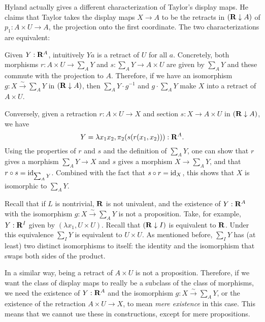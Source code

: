 \begin{remark}
  Hyland actually gives a different characterization of Taylor's display maps. He claims that Taylor takes the display maps $ X \to A $ to be the retracts in $ (\mathbf{R} \downarrow A) $ of $ p_1: A \times U \to A $,
  the projection onto the first coordinate. The two characterizations are equivalent:

  Given $ Y: \mathbf{R}^A $, intuitively $ Y a $ is a retract of $ U $ for all $ a $. Concretely, both morphisms $ r : A \times U \to \sum_A Y $ and $ s : \sum_A Y \to A \times U $ are given by $ \sum_A Y $ and these commute with the projection to $ A $. Therefore, if we have an isomorphism $ g: X \xrightarrow{\sim} \sum_A Y $ in $ (\mathbf{R} \downarrow A) $, then $ \sum_A Y \cdot g^{-1} $ and $ g \cdot \sum_A Y $ make $ X $ into a retract of $ A \times U $.

  Conversely, given a retraction $ r : A \times U \to X $ and section $ s : X \to A \times U $ in $ (\mathbf{R} \downarrow A) $, we have
  \[ Y = \lambda x_1 x_2, \pi_2 (s (r (x_1, x_2))) : \mathbf{R}^A. \]
  Using the properties of $ r $ and $ s $ and the definition of $ \sum_A Y $, one can show that $ r $ gives a morphism $ \sum_A Y \to X $ and $ s $ gives a morphism $ X \to \sum_A Y $, and that $ r \circ s = \text{id}_{\sum_A Y} $. Combined with the fact that $ s \circ r = \text{id}_{X} $, this shows that $ X $ is isomorphic to $ \sum_A Y $.
\end{remark}

\begin{remark}
  Recall that if $ L $ is nontrivial, $ \mathbf{R} $ is not univalent, and the existence of $ Y: \mathbf{R}^A $ with the isomorphism $ g: X \xrightarrow{\sim} \sum_A Y $ is not a proposition. Take, for example, $ Y : \mathbf{R}^I $ given by $ (\lambda x_1, U \times U) $. Recall that $ (\mathbf{R} \downarrow I) $ is equivalent to $ \mathbf{R} $. Under this equivalence $ \sum_I Y $ is equivalent to $ U \times U $. As mentioned before, $ \sum_I Y $ has (at least) two distinct isomorphisms to itself: the identity and the isomorphism that swaps both sides of the product.

  In a similar way, being a retract of $ A \times U $ is not a proposition. Therefore, if we want the class of display maps to really be a subclass of the class of morphisms, we need the existence of $ Y: \mathbf{R}^A $ and the isomorphism $ g : X \xrightarrow \sim \sum_A Y $, or the existence of the retraction $ A \times U \to X $, to mean \textit{mere existence} in this case. This means that we cannot use these in constructions, except for mere propositions.
\end{remark}

